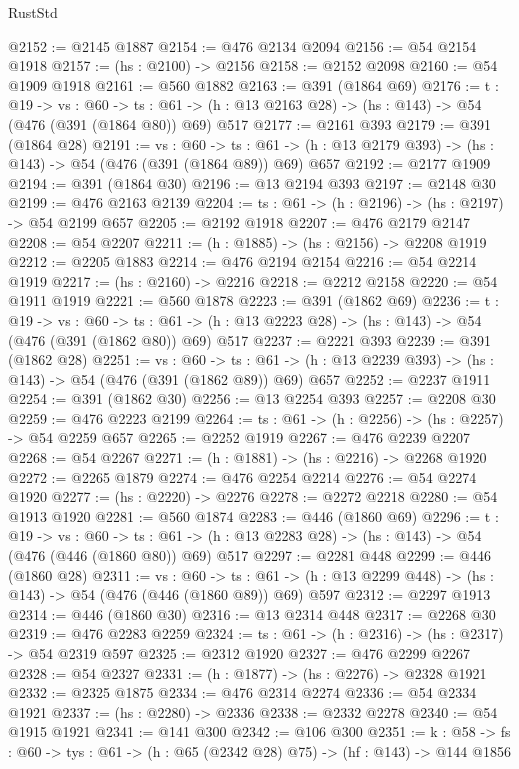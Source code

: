 \begin{lexlean}{RustStd}
\begin{coremodule}
@2152 := @2145 @1887
@2154 := @476 @2134 @2094
@2156 := @54 @2154 @1918
@2157 := (hs : @2100) -> @2156
@2158 := @2152 @2098
@2160 := @54 @1909 @1918
@2161 := @560 @1882
@2163 := @391 (@1864 @69)
@2176 := {t : @19} ->
  {vs : @60} ->
  {ts : @61} -> (h : @13 @2163 @28) -> (hs : @143) -> @54 (@476 (@391 (@1864 @80)) @69) @517
@2177 := @2161 @393
@2179 := @391 (@1864 @28)
@2191 := {vs : @60} ->
  {ts : @61} -> (h : @13 @2179 @393) -> (hs : @143) -> @54 (@476 (@391 (@1864 @89)) @69) @657
@2192 := @2177 @1909
@2194 := @391 (@1864 @30)
@2196 := @13 @2194 @393
@2197 := @2148 @30
@2199 := @476 @2163 @2139
@2204 := {ts : @61} -> (h : @2196) -> (hs : @2197) -> @54 @2199 @657
@2205 := @2192 @1918
@2207 := @476 @2179 @2147
@2208 := @54 @2207
@2211 := (h : @1885) -> (hs : @2156) -> @2208 @1919
@2212 := @2205 @1883
@2214 := @476 @2194 @2154
@2216 := @54 @2214 @1919
@2217 := (hs : @2160) -> @2216
@2218 := @2212 @2158
@2220 := @54 @1911 @1919
@2221 := @560 @1878
@2223 := @391 (@1862 @69)
@2236 := {t : @19} ->
  {vs : @60} ->
  {ts : @61} -> (h : @13 @2223 @28) -> (hs : @143) -> @54 (@476 (@391 (@1862 @80)) @69) @517
@2237 := @2221 @393
@2239 := @391 (@1862 @28)
@2251 := {vs : @60} ->
  {ts : @61} -> (h : @13 @2239 @393) -> (hs : @143) -> @54 (@476 (@391 (@1862 @89)) @69) @657
@2252 := @2237 @1911
@2254 := @391 (@1862 @30)
@2256 := @13 @2254 @393
@2257 := @2208 @30
@2259 := @476 @2223 @2199
@2264 := {ts : @61} -> (h : @2256) -> (hs : @2257) -> @54 @2259 @657
@2265 := @2252 @1919
@2267 := @476 @2239 @2207
@2268 := @54 @2267
@2271 := (h : @1881) -> (hs : @2216) -> @2268 @1920
@2272 := @2265 @1879
@2274 := @476 @2254 @2214
@2276 := @54 @2274 @1920
@2277 := (hs : @2220) -> @2276
@2278 := @2272 @2218
@2280 := @54 @1913 @1920
@2281 := @560 @1874
@2283 := @446 (@1860 @69)
@2296 := {t : @19} ->
  {vs : @60} ->
  {ts : @61} -> (h : @13 @2283 @28) -> (hs : @143) -> @54 (@476 (@446 (@1860 @80)) @69) @517
@2297 := @2281 @448
@2299 := @446 (@1860 @28)
@2311 := {vs : @60} ->
  {ts : @61} -> (h : @13 @2299 @448) -> (hs : @143) -> @54 (@476 (@446 (@1860 @89)) @69) @597
@2312 := @2297 @1913
@2314 := @446 (@1860 @30)
@2316 := @13 @2314 @448
@2317 := @2268 @30
@2319 := @476 @2283 @2259
@2324 := {ts : @61} -> (h : @2316) -> (hs : @2317) -> @54 @2319 @597
@2325 := @2312 @1920
@2327 := @476 @2299 @2267
@2328 := @54 @2327
@2331 := (h : @1877) -> (hs : @2276) -> @2328 @1921
@2332 := @2325 @1875
@2334 := @476 @2314 @2274
@2336 := @54 @2334 @1921
@2337 := (hs : @2280) -> @2336
@2338 := @2332 @2278
@2340 := @54 @1915 @1921
@2341 := @141 @300
@2342 := @106 @300
@2351 := {k : @58} ->
  {fs : @60} -> {tys : @61} -> (h : @65 (@2342 @28) @75) -> (hf : @143) -> @144 @1856

\end{coremodule}
\end{lexlean}
